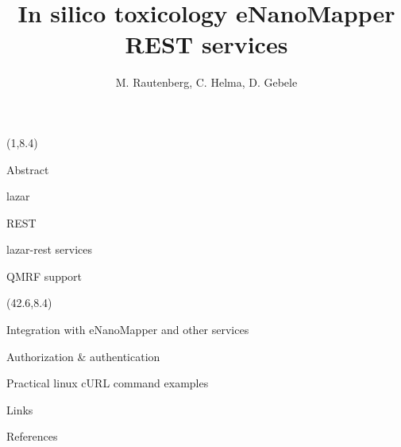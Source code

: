\documentclass[final]{beamer}
\title{In silico toxicology eNanoMapper REST services}
\author{M. Rautenberg, C. Helma, D. Gebele}
\institute{\emph{in silico} toxicology gmbh, Basel, Switzerland}
\begin{document}
  \begin{frame}{}

    \begin{textblock}{40.5}(1,8.4)
      \begin{block}{Abstract}
        \justifying
        
      \end{block}

      \begin{block}{lazar}
        \justifying
        
      \end{block}

      \begin{block}{REST}
        \justifying
        
      \end{block}

      \begin{block}{lazar-rest services}
        \justifying
        
      \end{block}


      \begin{block}{QMRF support}
        \justifying
        
      \end{block}

    \end{textblock}

    \begin{textblock}{40.5}(42.6,8.4)

      \begin{block}{Integration with eNanoMapper and other services}
        
      \end{block}

      \begin{block}{Authorization \& authentication}
        \justifying        
        
      \end{block}

      \begin{alertblock}{Practical linux cURL command examples}
        
      \end{alertblock}

      \begin{exampleblock}{Links}
        
      \end{exampleblock}

      \begin{block}{References}
        \justifying
        \small
      \end{block}

    \end{textblock}

  \end{frame}
\end{document}
